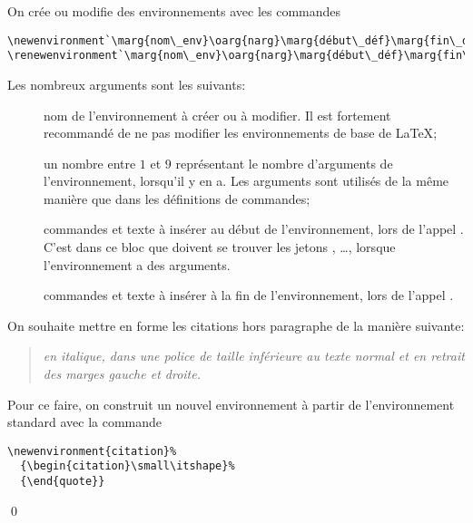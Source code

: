 On crée ou modifie des environnements avec les commandes
\begin{lstlisting}
\newenvironment`\marg{nom\_env}\oarg{narg}\marg{début\_déf}\marg{fin\_déf}'
\renewenvironment`\marg{nom\_env}\oarg{narg}\marg{début\_déf}\marg{fin\_déf}'
\end{lstlisting}
Les nombreux arguments sont les suivants:
\begin{description}
\item[] nom de l'environnement à créer ou à modifier.
  Il est fortement recommandé de ne pas modifier les environnements de
  base de {\LaTeX};
\item[] un nombre entre $1$ et $9$ représentant le nombre
  d'arguments de l'environnement, lorsqu'il y en a. Les arguments sont
  utilisés de la même manière que dans les définitions de commandes;
\item[] commandes et texte à insérer au début de
  l'environnement, lors de l'appel
  \code{\}}. C'est dans ce bloc que doivent
  se trouver les jetons , \dots, \code{\#}
  lorsque l'environnement a des arguments.
\item[] commandes et texte à insérer à la fin de
  l'environnement, lors de l'appel \code{\}}.
\end{description}

\begin{exemple}
  On souhaite mettre en forme les citations hors paragraphe de la
  manière suivante:
  \begin{quote}
    \small\itshape%
    en italique, dans une police de taille inférieure au texte
    normal et en retrait des marges gauche et droite.
  \end{quote}
  Pour ce faire, on construit un nouvel environnement  à
  partir de l'environnement standard  avec la commande
\begin{lstlisting}
\newenvironment{citation}%
  {\begin{citation}\small\itshape}%
  {\end{quote}}
\end{lstlisting}
  \qed
\end{exemple}

